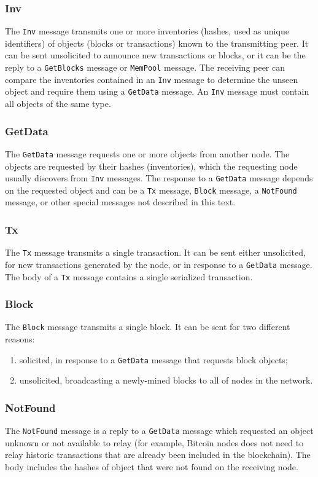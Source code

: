 \subsubsection{Inv}
The \texttt{Inv} message transmits one or more inventories (hashes, used as unique identifiers) of objects (blocks or transactions) known to the transmitting peer.
It can be sent unsolicited to announce new transactions or blocks, or it can be the reply to a \texttt{GetBlocks} message or \texttt{MemPool} message.
The receiving peer can compare the inventories contained in an \texttt{Inv} message to determine the unseen object and require them using a \texttt{GetData} message.
An \texttt{Inv} message must contain all objects of the same type.

\subsubsection{GetData}
The \texttt{GetData} message requests one or more objects from another node.
The objects are requested by their hashes (inventories), which the requesting node usually discovers from \texttt{Inv} messages.
The response to a \texttt{GetData} message depends on the requested object and can be a \texttt{Tx} message, \texttt{Block} message, a \texttt{NotFound} message, or other special messages not described in this text.

\subsubsection{Tx}
The \texttt{Tx} message transmits a single transaction.
It can be sent either unsolicited, for new transactions generated by the node, or in response to a \texttt{GetData} message.
The body of a \texttt{Tx} message contains a single serialized transaction.

\subsubsection{Block}
The \texttt{Block} message transmits a single block.
It can be sent for two different reasons:
\begin{enumerate}
	\item solicited, in response to a \texttt{GetData} message that requests block objects;
	\item unsolicited, broadcasting a newly-mined blocks to all of nodes in the network.
\end{enumerate}

\subsubsection{NotFound}
The \texttt{NotFound} message is a reply to a \texttt{GetData} message which requested an object unknown or not available to relay (for example, Bitcoin nodes does not need to relay historic transactions that are already been included in the blockchain).
The body includes the hashes of object that were not found on the receiving node.
